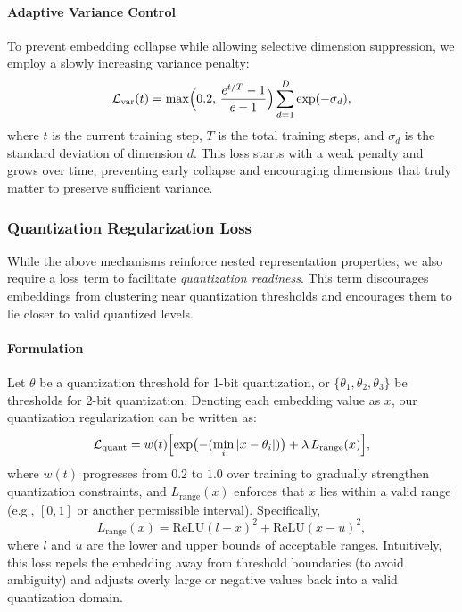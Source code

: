 \paragraph{Adaptive Variance Control}
To prevent embedding collapse while allowing selective dimension suppression, we employ a slowly increasing variance penalty:
\begin{equation}
    \mathcal{L}_{\text{var}}(t) 
    = 
    \max\Bigl(0.2,\, \frac{e^{t/T} - 1}{e - 1}\Bigr) 
    \sum_{d=1}^D 
    \exp(-\sigma_d),
\end{equation}
where $t$ is the current training step, $T$ is the total training steps, and $\sigma_d$ is the standard deviation of dimension $d$. This loss starts with a weak penalty and grows over time, preventing early collapse and encouraging dimensions that truly matter to preserve sufficient variance.

\subsubsection{Quantization Regularization Loss}
\label{subsubsec:quant_reg}
While the above mechanisms reinforce nested representation properties, we also require a loss term to facilitate \emph{quantization readiness}. This term discourages embeddings from clustering near quantization thresholds and encourages them to lie closer to valid quantized levels.

\paragraph{Formulation}
Let $\theta$ be a quantization threshold for 1-bit quantization, or $\{\theta_1, \theta_2, \theta_3\}$ be thresholds for 2-bit quantization. Denoting each embedding value as $x$, our quantization regularization can be written as:
\begin{equation}
    \mathcal{L}_{\text{quant}} 
    = 
    w(t) 
    \Bigl[
        \exp\bigl(-(\min_i |x - \theta_i|)\bigr) 
        + 
        \lambda\,L_{\text{range}}(x)
    \Bigr],
\end{equation}
where $w(t)$ progresses from $0.2$ to $1.0$ over training to gradually strengthen quantization constraints, and $L_{\text{range}}(x)$ enforces that $x$ lies within a valid range (e.g., $[0,1]$ or another permissible interval). Specifically,
\begin{equation}
    L_{\text{range}}(x) 
    = 
    \text{ReLU}(l - x)^2 
    + 
    \text{ReLU}(x - u)^2,
\end{equation}
where $l$ and $u$ are the lower and upper bounds of acceptable ranges. Intuitively, this loss repels the embedding away from threshold boundaries (to avoid ambiguity) and adjusts overly large or negative values back into a valid quantization domain.


